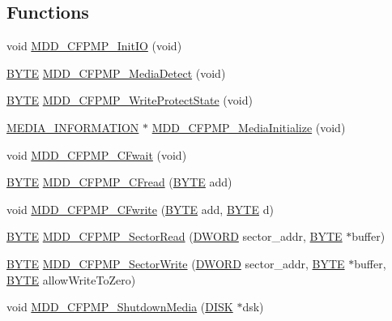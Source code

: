 \subsection*{Functions}
\begin{DoxyCompactItemize}
\item 
void \hyperlink{_c_f-_p_m_p_8c_a408b56945a369c5bdde02a058679fce9}{M\+D\+D\+\_\+\+C\+F\+P\+M\+P\+\_\+\+Init\+I\+O} (void)
\item 
\hyperlink{_generic_type_defs_8h_a4ae1dab0fb4b072a66584546209e7d58}{B\+Y\+T\+E} \hyperlink{_c_f-_p_m_p_8c_afe0db232f6fa067f467828dabd985ccd}{M\+D\+D\+\_\+\+C\+F\+P\+M\+P\+\_\+\+Media\+Detect} (void)
\item 
\hyperlink{_generic_type_defs_8h_a4ae1dab0fb4b072a66584546209e7d58}{B\+Y\+T\+E} \hyperlink{_c_f-_p_m_p_8c_ad245068649eadb67a89f6a589f4bf2c0}{M\+D\+D\+\_\+\+C\+F\+P\+M\+P\+\_\+\+Write\+Protect\+State} (void)
\item 
\hyperlink{struct_m_e_d_i_a___i_n_f_o_r_m_a_t_i_o_n}{M\+E\+D\+I\+A\+\_\+\+I\+N\+F\+O\+R\+M\+A\+T\+I\+O\+N} $\ast$ \hyperlink{_c_f-_p_m_p_8c_aaffe0c76d2b2fc65560eaeef68881293}{M\+D\+D\+\_\+\+C\+F\+P\+M\+P\+\_\+\+Media\+Initialize} (void)
\item 
void \hyperlink{_c_f-_p_m_p_8c_a4c29530f84e422bdd8da8e67bc7bb743}{M\+D\+D\+\_\+\+C\+F\+P\+M\+P\+\_\+\+C\+Fwait} (void)
\item 
\hyperlink{_generic_type_defs_8h_a4ae1dab0fb4b072a66584546209e7d58}{B\+Y\+T\+E} \hyperlink{_c_f-_p_m_p_8c_a4027bb98ca68baf83d47a23636046ee5}{M\+D\+D\+\_\+\+C\+F\+P\+M\+P\+\_\+\+C\+Fread} (\hyperlink{_generic_type_defs_8h_a4ae1dab0fb4b072a66584546209e7d58}{B\+Y\+T\+E} add)
\item 
void \hyperlink{_c_f-_p_m_p_8c_a767298e05fe030bd0caac51b1718c1d7}{M\+D\+D\+\_\+\+C\+F\+P\+M\+P\+\_\+\+C\+Fwrite} (\hyperlink{_generic_type_defs_8h_a4ae1dab0fb4b072a66584546209e7d58}{B\+Y\+T\+E} add, \hyperlink{_generic_type_defs_8h_a4ae1dab0fb4b072a66584546209e7d58}{B\+Y\+T\+E} d)
\item 
\hyperlink{_generic_type_defs_8h_a4ae1dab0fb4b072a66584546209e7d58}{B\+Y\+T\+E} \hyperlink{_c_f-_p_m_p_8c_a7f142f5717ca2b665446d916c9be2d8b}{M\+D\+D\+\_\+\+C\+F\+P\+M\+P\+\_\+\+Sector\+Read} (\hyperlink{_generic_type_defs_8h_ad342ac907eb044443153a22f964bf0af}{D\+W\+O\+R\+D} sector\+\_\+addr, \hyperlink{_generic_type_defs_8h_a4ae1dab0fb4b072a66584546209e7d58}{B\+Y\+T\+E} $\ast$buffer)
\item 
\hyperlink{_generic_type_defs_8h_a4ae1dab0fb4b072a66584546209e7d58}{B\+Y\+T\+E} \hyperlink{_c_f-_p_m_p_8c_af7a92782e234204c924e54191ab18a64}{M\+D\+D\+\_\+\+C\+F\+P\+M\+P\+\_\+\+Sector\+Write} (\hyperlink{_generic_type_defs_8h_ad342ac907eb044443153a22f964bf0af}{D\+W\+O\+R\+D} sector\+\_\+addr, \hyperlink{_generic_type_defs_8h_a4ae1dab0fb4b072a66584546209e7d58}{B\+Y\+T\+E} $\ast$buffer, \hyperlink{_generic_type_defs_8h_a4ae1dab0fb4b072a66584546209e7d58}{B\+Y\+T\+E} allow\+Write\+To\+Zero)
\item 
void \hyperlink{_c_f-_p_m_p_8c_ae6c6d83df9b5212e882c80dd87048ebd}{M\+D\+D\+\_\+\+C\+F\+P\+M\+P\+\_\+\+Shutdown\+Media} (\hyperlink{struct_d_i_s_k}{D\+I\+S\+K} $\ast$dsk)
\end{DoxyCompactItemize}


